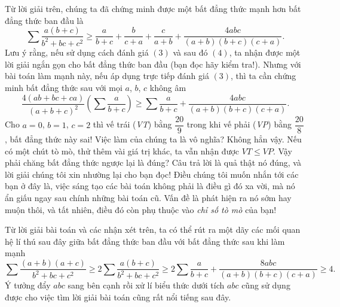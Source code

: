 \begin{bt}
\begin{nx}
\end{nx}
\begin{nx}
	Từ lời giải trên, chúng ta đã chứng minh được một bất đẳng thức mạnh hơn bất đẳng thức ban đầu là
		$$\sum \dfrac{a(b+c)}{b^2+bc+c^2} \geqslant \dfrac{a}{b+c}+\dfrac{b}{c+a}+\dfrac{c}{a+b}+\dfrac{4abc}{(a+b)(b+c)(c+a)}.$$
	Lưu ý rằng, nếu sử dụng cách đánh giá $(3)$ và sau đó $(4)$, ta nhận được một lời giải ngắn gọn cho bất đẳng thức ban đầu (bạn đọc hãy kiểm tra!). Nhưng với bài toán làm mạnh này, nếu áp dụng trực tiếp đánh giá $(3)$, thì ta cần chứng minh bất đẳng thức sau với mọi $a$, $b$, $c$ không âm
		$$\dfrac{4(ab+bc+ca)}{(a+b+c)^2}\left(\sum \dfrac{a}{b+c} \right) \geqslant \sum \dfrac{a}{b+c}+\dfrac{4abc}{(a+b)(b+c)(c+a)}.$$
	Cho $a=0$, $b=1$, $c=2$ thì vế trái (\textit{VT}) bằng $\dfrac{20}{9}$ trong khi vế phải (\textit{VP}) bằng $\dfrac{20}{8}$, bất đẳng thức này sai! Việc làm của chúng ta là vô nghĩa? Không hẳn vậy. Nếu có một chút tò mò, thử thêm vài giá trị khác, ta vẫn nhận được $VT \leqslant VP$. Vậy phải chăng bất đẳng thức ngược lại là đúng? Câu trả lời là quả thật nó đúng, và lời giải chúng tôi xin nhường lại cho bạn đọc! Điều chúng tôi muốn nhắn tới các bạn ở đây là, việc sáng tạo các bài toán không phải là điều gì đó xa vời, mà nó ẩn giấu ngay sau chính những bài toán cũ. Vấn đề là phát hiện ra nó sớm hay muộn thôi, và tất nhiên, điều đó còn phụ thuộc vào \textit{chỉ số tò mò} của bạn!
\end{nx}
\begin{nx}
	Từ lời giải bài toán và các nhận xét trên, ta có thể rút ra một dãy các mối quan hệ lí thú sau đây giữa bất đẳng thức ban đầu với bất đẳng thức sau khi làm mạnh
	 	$$\sum \dfrac{(a+b)(a+c)}{b^2+bc+c^2} \geqslant 2\sum \dfrac{a(b+c)}{b^2+bc+c^2} \geqslant 2\sum \dfrac{a}{b+c}+\dfrac{8abc}{(a+b)(b+c)(c+a)} \geqslant 4.$$
	Ý tưởng đẩy $abc$ sang bên cạnh rồi xử lí biểu thức dưới tích $abc$ cũng sử dụng được cho việc tìm lời giải bài toán cũng rất nổi tiếng sau đây.
	 
\end{nx}
\end{bt}


